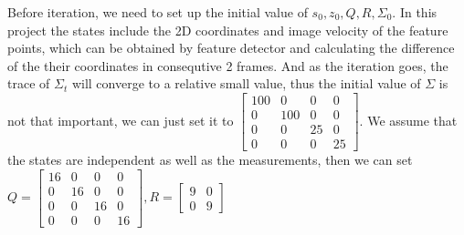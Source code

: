 \documentclass{article}
\begin{document}
\par 
Before iteration, we need to set up the initial value of $s_0,z_0,Q,R,\Sigma_0$. In this project the states include the 2D coordinates and image velocity of the feature points, which can be obtained by feature detector and calculating the difference of the their coordinates in consequtive 2 frames. And as the iteration goes, the trace of $\Sigma_t$ will converge to a relative small value, thus the initial value of $\Sigma$ is not that important, we can just set it to $\begin{bmatrix}100&0&0&0\\0&100&0&0\\0&0&25&0\\0&0&0&25\end{bmatrix}$. We assume that the states are independent as well as the measurements, then we can set $Q=\begin{bmatrix}16&0&0&0\\0&16&0&0\\0&0&16&0\\0&0&0&16\end{bmatrix},R=\begin{bmatrix}9&0\\0&9\end{bmatrix}$
\end{document}
